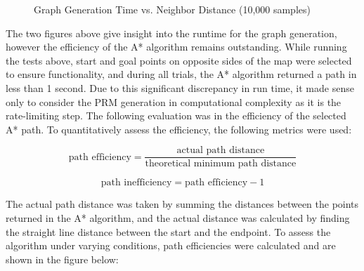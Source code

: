 \documentclass{article}
\begin{document}
\begin{figure}[H]
\centering
{}
\caption{Graph Generation Time vs. Neighbor Distance (10,000 samples)}
\label{fig:time_distance}
\end{figure}

The two figures above give insight into the runtime for the graph generation, however the efficiency of the A* algorithm remains outstanding. While running the tests above, start and goal points on opposite sides of the map were selected to ensure functionality, and during all trials, the A* algorithm returned a path in less than 1 second. Due to this significant discrepancy in run time, it made sense only to consider the PRM generation in computational complexity as it is the rate-limiting step. The following evaluation was in the efficiency of the selected A* path. To quantitatively assess the efficiency, the following metrics were used: 

\begin{equation}
\text{path efficiency} = \frac{\text{actual path distance}}{\text{theoretical minimum path distance}}
\end{equation}

\begin{equation}
\text{path inefficiency} = \text{path efficiency} - 1
\end{equation}

The actual path distance was taken by summing the distances between the points returned in the A* algorithm, and the actual distance was calculated by finding the straight line distance between the start and the endpoint. To assess the algorithm under varying conditions, path efficiencies were calculated and are shown in the figure below:
\end{document}
